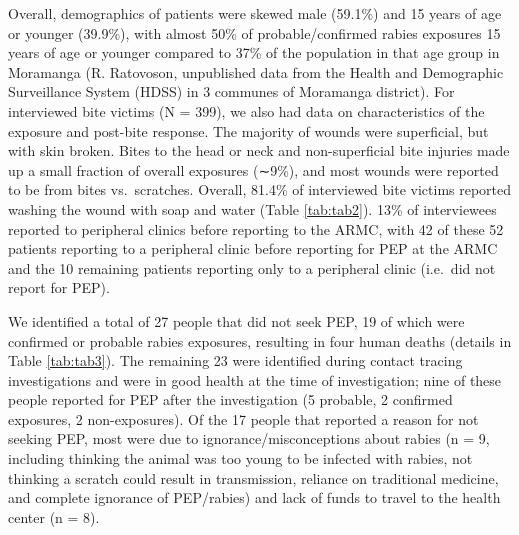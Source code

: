 \documentclass[
  oneside]{book}
\begin{document}
Overall, demographics of patients were skewed male (59.1\%) and 15 years of age or younger (39.9\%), with almost 50\% of probable/confirmed rabies exposures 15 years of age or younger compared to 37\% of the population in that age group in Moramanga (R. Ratovoson, unpublished data from the Health and Demographic Surveillance System (HDSS) in 3 communes of Moramanga district). For interviewed bite victims (N = 399), we also had data on characteristics of the exposure and post-bite response. The majority of wounds were superficial, but with skin broken. Bites to the head or neck and non-superficial bite injuries made up a small fraction of overall exposures (∼9\%), and most wounds were reported to be from bites vs.~scratches. Overall, 81.4\% of interviewed bite victims reported washing the wound with soap and water (Table \ref{tab:tab2}). 13\% of interviewees reported to peripheral clinics before reporting to the ARMC, with 42 of these 52 patients reporting to a peripheral clinic before reporting for PEP at the ARMC and the 10 remaining patients reporting only to a peripheral clinic (i.e.~did not report for PEP).

We identified a total of 27 people that did not seek PEP, 19 of which were confirmed or probable rabies exposures, resulting in four human deaths (details in Table \ref{tab:tab3}). The remaining 23 were identified during contact tracing investigations and were in good health at the time of investigation; nine of these people reported for PEP after the investigation (5 probable, 2 confirmed exposures, 2 non-exposures). Of the 17 people that reported a reason for not seeking PEP, most were due to ignorance/misconceptions about rabies (n = 9, including thinking the animal was too young to be infected with rabies, not thinking a scratch could result in transmission, reliance on traditional medicine, and complete ignorance of PEP/rabies) and lack of funds to travel to the health center (n = 8).
\end{document}
